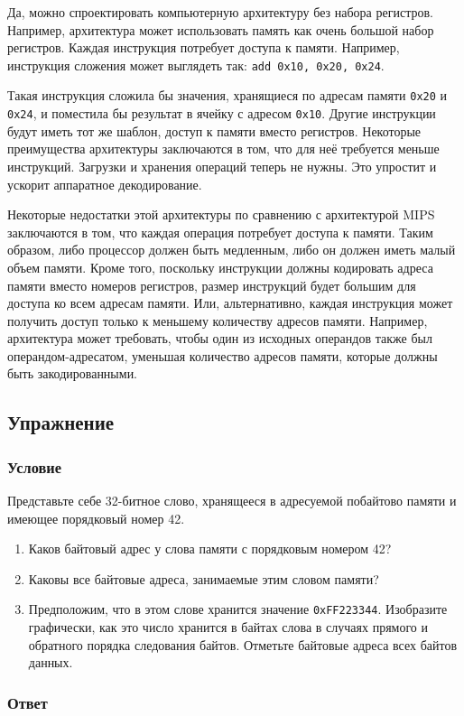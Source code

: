 \documentclass[12pt]{article}
\newenvironment{e}[1][dummy label]{
    \subsection{Упражнение}\label{#1}
    \subsubsection*{Условие}
    }{
    \subsubsection*{Ответ}
}
\begin{document}
    Да, можно спроектировать компьютерную архитектуру без набора регистров. Например, архитектура может использовать память как очень большой набор регистров. Каждая инструкция потребует доступа к памяти. Например, инструкция сложения может выглядеть так: \texttt{add 0x10, 0x20, 0x24}.

    Такая инструкция сложила бы значения, хранящиеся по адресам памяти \texttt{0x20} и \texttt{0x24}, и поместила бы результат в ячейку с адресом \texttt{0x10}. Другие инструкции будут иметь тот же шаблон, доступ к памяти вместо регистров. Некоторые преимущества архитектуры заключаются в том, что для неё требуется меньше инструкций. Загрузки и хранения операций теперь не нужны. Это упростит и ускорит аппаратное декодирование.

    Некоторые недостатки этой архитектуры по сравнению с архитектурой MIPS заключаются в том, что каждая операция потребует доступа к памяти. Таким образом, либо процессор должен быть медленным, либо он должен иметь малый объем памяти. Кроме того, поскольку инструкции должны кодировать адреса памяти вместо номеров регистров, размер инструкций будет большим для доступа ко всем адресам памяти. Или, альтернативно, каждая инструкция может получить доступ только к меньшему количеству адресов памяти. Например, архитектура может требовать, чтобы один из исходных операндов также был операндом-адресатом, уменьшая количество адресов памяти, которые должны быть закодированными.

    \newpage

    \begin{e}[e:32b]
        Представьте себе 32-битное слово, хранящееся в адресуемой побайтово памяти и имеющее порядковый номер 42.
        \begin{enumerate}
            \item Каков байтовый адрес у слова памяти с порядковым номером 42?
            \item Каковы все байтовые адреса, занимаемые этим словом памяти?
            \item Предположим, что в этом слове хранится значение \texttt{0xFF223344}. Изобразите графически, как это число хранится в байтах слова в случаях прямого и обратного порядка следования байтов. Отметьте байтовые адреса всех байтов данных.
        \end{enumerate}
    \end{e}
\end{document}
